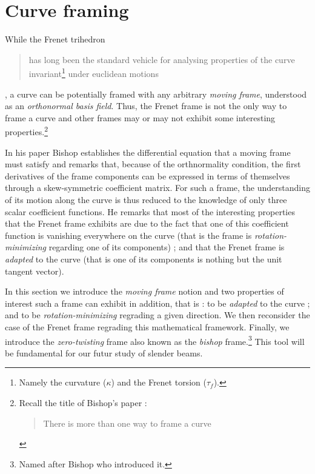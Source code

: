 
\section{Curve framing}


While the Frenet trihedron \blockcquote[p.1]{Bishop1975}{has long been the standard vehicle for analysing properties of the curve invariant\footnote{Namely the curvature ($\kappa$) and the Frenet torsion ($\tau_f$).} under euclidean motions}, a curve can be potentially framed with any arbitrary \emph{moving frame}, understood as an \emph{orthonormal basis field}. Thus, the Frenet frame is not the only way to frame a curve and other frames may or may not exhibit some interesting properties.\footnote{Recall the title of Bishop's paper : \blockcquote[]{Bishop1975}{There is more than one way to frame a curve}.} 

In his paper \cite{Bishop1975} Bishop establishes the differential equation that a moving frame must satisfy and remarks that, because of the orthnormality condition, the first derivatives of the frame components can be expressed in terms of themselves through a skew-symmetric coefficient matrix. For such a frame, the understanding of its motion along the curve is thus reduced to the knowledge of only three scalar coefficient functions. He remarks that most of the interesting properties that the Frenet frame exhibits are due to the fact that one of this coefficient function is vanishing everywhere on the curve (that is the frame is \emph{rotation-minimizing} regarding one of its components) ; and that the Frenet frame is \emph{adapted} to the curve (that is one of its components is nothing but the unit tangent vector).

In this section we introduce the \emph{moving frame} notion and two properties of interest such a frame can exhibit in addition, that is : to be \emph{adapted} to the curve ; and to be \emph{rotation-minimizing} regrading a given direction. We then reconsider the case of the Frenet frame regrading this mathematical framework. Finally, we introduce the \emph{zero-twisting} frame also known as the \emph{bishop} frame.\footnote{Named after Bishop who introduced it.} This tool will be fundamental for our futur study of slender beams.

